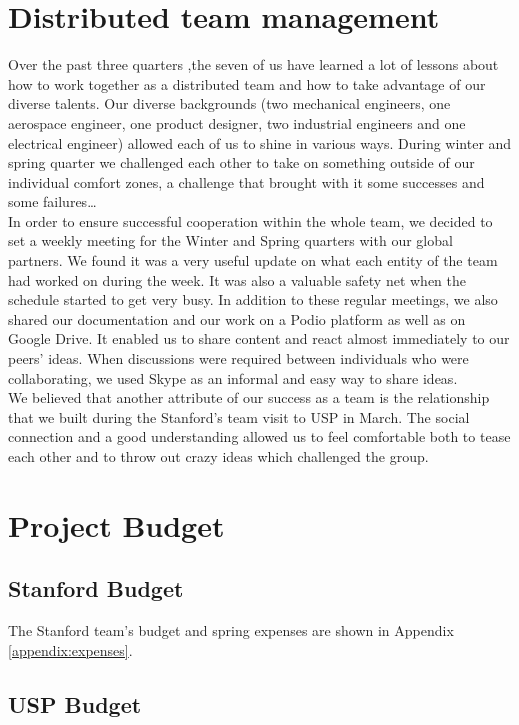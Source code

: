 \section{Distributed team management}

Over the past three quarters ,the seven of us have learned a lot of lessons about how to work together as a distributed team and how to take advantage of our diverse talents. Our diverse backgrounds (two mechanical engineers, one aerospace engineer, one product designer, two industrial engineers and one electrical engineer) allowed each of us to shine in various ways. During winter and spring quarter we challenged each other to take on something outside of our individual comfort zones, a challenge that brought with it some successes and some failures…\\

In order to ensure successful cooperation within the whole team, we decided to set a weekly meeting for the Winter and Spring quarters with our global partners. We found it was a very useful update on what each entity of the team had worked on during the week. It was also a valuable safety net when the schedule started to get very busy. In addition to these regular meetings, we also shared our documentation and our work on a Podio platform as well as on Google Drive. It enabled us to share content and react almost immediately to our peers’ ideas. When discussions were required between individuals who were collaborating, we used Skype as an informal and easy way to share ideas.\\

We believed that another attribute of our success as a team is the relationship that we built during the Stanford’s team visit to USP in March. The social connection and a good understanding allowed us to feel comfortable both to tease each other and to throw out crazy ideas which challenged the group.


\section{Project Budget}

\subsection{Stanford Budget}
The Stanford team's budget and spring expenses are shown in Appendix \ref{appendix:expenses}.

\subsection{USP Budget}
 
